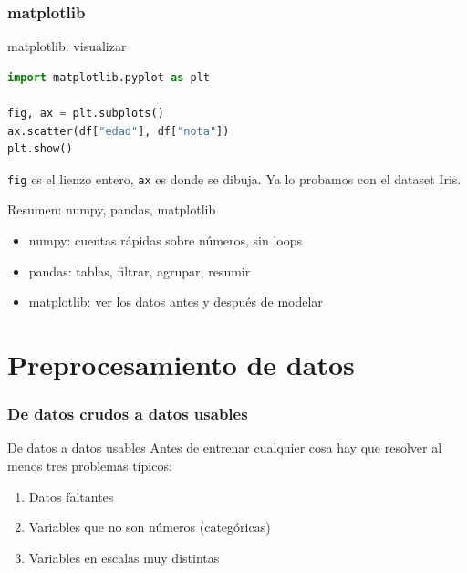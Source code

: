 \section{matplotlib}

\begin{frame}[fragile]{matplotlib: visualizar}
  \begin{lstlisting}[language=Python]
import matplotlib.pyplot as plt

fig, ax = plt.subplots()
ax.scatter(df["edad"], df["nota"])
plt.show()
  \end{lstlisting}
  \pause
  \texttt{fig} es el lienzo entero, \texttt{ax} es donde se dibuja. Ya lo
  probamos con el dataset Iris.
\end{frame}

\begin{frame}{Resumen: numpy, pandas, matplotlib}
  \begin{itemize}
    \item numpy: cuentas rápidas sobre números, sin loops
    \item pandas: tablas, filtrar, agrupar, resumir
    \item matplotlib: ver los datos antes y después de modelar
  \end{itemize}
\end{frame}

\part{Preprocesamiento de datos}
\frame{\partpage}

\section{De datos crudos a datos usables}

\begin{frame}{De datos a datos usables}
  Antes de entrenar cualquier cosa hay que resolver al menos tres
  problemas típicos:
  \begin{enumerate}
    \item Datos faltantes
    \item Variables que no son números (categóricas)
    \item Variables en escalas muy distintas
  \end{enumerate}
\end{frame}

